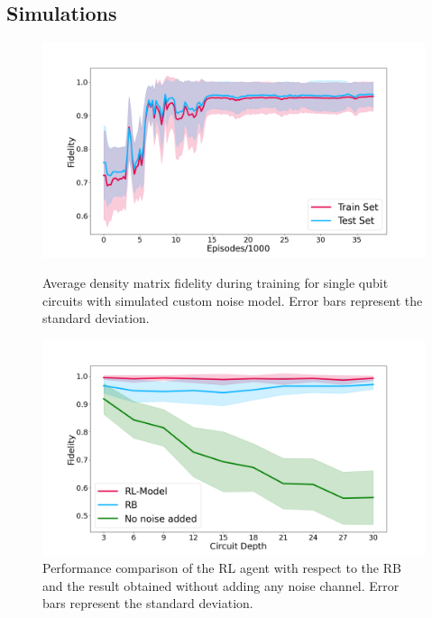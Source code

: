 \documentclass[sn-basic]{sn-jnl} %
\begin{document}
\subsection{Simulations} \label{sec_simulation}

\begin{figure}
    \centering
    \includegraphics[width=\textwidth]{1Q_train_results.png}
    \caption{Average density matrix fidelity during training for single qubit circuits with simulated 
    custom noise model. Error bars represent the standard deviation.}\label{fig_1q_sim_train}
    \includegraphics[width=\textwidth]{1Q_rb.png}
    \caption{Performance comparison of the RL agent with respect to the RB and the result obtained 
    without adding any noise channel. Error bars represent the standard deviation.}\label{fig_1q_sim_bench}
\end{figure}
\end{document}
